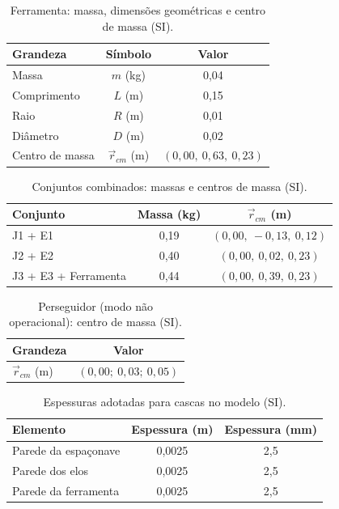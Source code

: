 
\begin{table}[H]
\centering
\caption{Ferramenta: massa, dimensões geométricas e centro de massa (SI).}
\label{tab_perseguidor_ferramenta_SI}
\begin{tabular}{lcc}
\hline
\textbf{Grandeza} & \textbf{Símbolo} & \textbf{Valor} \\
\hline
Massa & $m$ (kg) & 0,04 \\
Comprimento & $L$ (m) & 0,15 \\
Raio & $R$ (m) & 0,01 \\
Diâmetro & $D$ (m) & 0,02 \\
Centro de massa & $\vec{r}_{cm}$ (m) & $(0,00,\ 0,63,\ 0,23)$ \\
\hline
\end{tabular}
\end{table}

\begin{table}[H]
\centering
\caption{Conjuntos combinados: massas e centros de massa (SI).}
\label{tab_perseguidor_combinados_SI}
\begin{tabular}{lcc}
\hline
\textbf{Conjunto} & \textbf{Massa (kg)} & \textbf{$\vec{r}_{cm}$ (m)} \\
\hline
J1 + E1 & 0,19 & $(0,00,\ -0,13,\ 0,12)$ \\
J2 + E2 & 0,40 & $(0,00,\ 0,02,\ 0,23)$ \\
J3 + E3 + Ferramenta & 0,44 & $(0,00,\ 0,39,\ 0,23)$ \\
\hline
\end{tabular}
\end{table}

\begin{table}[H]
\centering
\caption{Perseguidor (modo não operacional): centro de massa (SI).}
\label{tab_perseguidor_home_com_SI}
\begin{tabular}{lc}
\hline
\textbf{Grandeza} & \textbf{Valor} \\
\hline
$\vec{r}_{cm}$ (m) & $(0,00;\ 0,03;\ 0,05)$ \\
\hline
\end{tabular}
\end{table}


\begin{table}[H]
\centering
\caption{Espessuras adotadas para cascas no modelo (SI).}
\label{tab_perseguidor_espessuras_SI_milim}
\begin{tabular}{lcc}
\hline
\textbf{Elemento} & \textbf{Espessura (m)} & \textbf{Espessura (mm)} \\
\hline
Parede da espaçonave & 0,0025 & 2,5 \\
Parede dos elos & 0,0025 & 2,5 \\
Parede da ferramenta & 0,0025 & 2,5 \\
\hline
\end{tabular}
\end{table}

